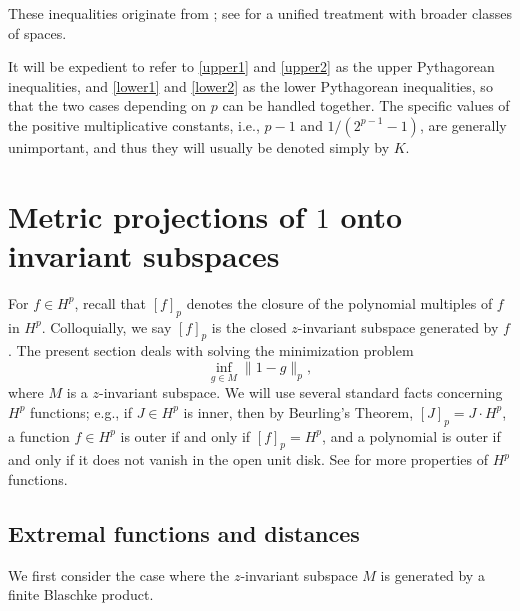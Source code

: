 \documentclass{article}
\theoremstyle{plain}
\numberwithin{Theorem}{section}
\numberwithin{equation}{section}
\theoremstyle{plain}
\theoremstyle{definition}
\begin{document}
These inequalities originate from \cite{Byn,BD,CMP1}; see \cite[Corollary 3.4]{CR} for a unified treatment with broader classes of spaces.

 It will be expedient to refer to \eqref{upper1} and \eqref{upper2} as the upper Pythagorean inequalities, and \eqref{lower1} and \eqref{lower2} as the lower Pythagorean inequalities, so that the two cases depending on $p$ can be handled together.  The specific values of the positive multiplicative constants, i.e., $p-1$ and $1/(2^{p-1}-1)$, are generally unimportant, and thus they will usually be denoted simply by $K$.








\section{Metric projections of $1$ onto invariant subspaces}\label{MetP}

\noindent For $f \in H^p$, recall that $[f]_p$ denotes the closure of the polynomial multiples of $f$ in $H^p$. Colloquially, we say $[f]_p$ is the closed $z$-invariant subspace generated by $f$.  
The present section deals with solving the minimization problem
\[
\inf_{g \in M} \| 1 - g\|_p,
\]
where $M$ is a $z$-invariant subspace. 
We will use several standard facts concerning $H^p$ functions; e.g., if $J\in H^p$ is inner, then by Beurling's Theorem, $[J]_p = J \cdot H^p$, a function $f \in H^p$ is outer if and only if $[f]_p = H^p$, and a polynomial is outer if and only if it does not vanish in the open unit disk. See \cite{Duren} for more properties of $H^p$ functions. 

\subsection{Extremal functions and distances}
We first consider the case where the $z$-invariant  subspace $M$ is generated by a finite Blaschke product. 
\end{document}
